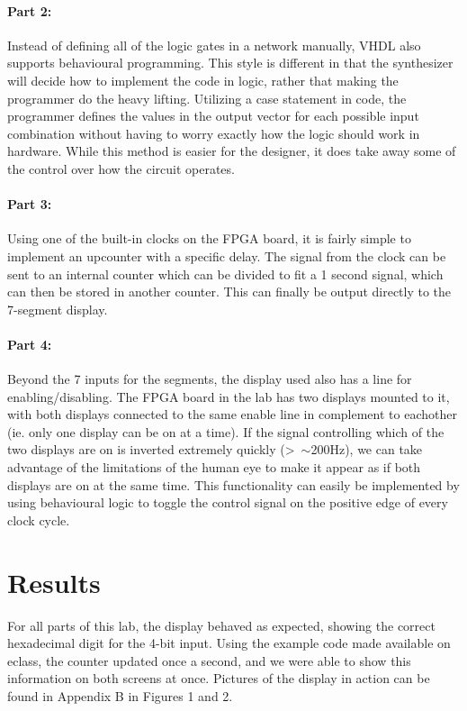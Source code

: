 \documentclass{article}
\begin{document}
\paragraph{Part 2:}

Instead of defining all of the logic gates in a network manually, VHDL also supports
behavioural programming.
This style is different in that the synthesizer will decide how to implement
the code in logic, rather that making the programmer do the heavy lifting.
Utilizing a case statement in code, the programmer defines the values in the output vector for each possible input combination
without having to worry exactly how the logic should work in hardware.
While this method is easier for the designer, it does take away some of the control over how the circuit operates.

\paragraph{Part 3:}

Using one of the built-in clocks on the FPGA board, it is fairly simple to implement an upcounter with a specific delay.
The signal from the clock can be sent to an internal counter which can
be divided to fit a 1 second signal, which can then be stored in another counter. This can finally be output directly to the 7-segment display.

\paragraph{Part 4:}

Beyond the 7 inputs for the segments, the display used also has a line for enabling/disabling. The FPGA board in the lab has two displays mounted to it, with both displays connected to the same enable line in complement to eachother (ie. only one display can be on at a time). If the signal controlling which of the two displays are on is inverted 
extremely quickly (\textgreater\ $\sim$200Hz), we can take advantage of the limitations
of the human eye to make it appear as if both displays are on at the same time.
This functionality can easily be implemented by using behavioural logic to
toggle the control signal on the positive edge of every clock cycle.

\section{Results}

For all parts of this lab, the display behaved as expected,
showing the correct hexadecimal digit for the 4-bit input.
Using the example code made available on eclass, the counter updated once a second, and we were able
to show this information on both screens at once.
Pictures of the display in action can be found in Appendix B in Figures 1 and 2.
\end{document}

